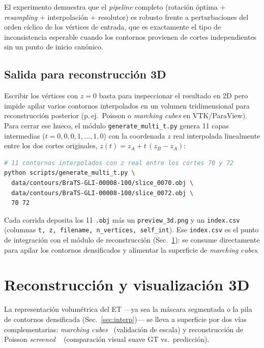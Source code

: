 \documentclass[conference]{IEEEtran}
\begin{document}
El experimento demuestra que el \emph{pipeline} completo (rotación óptima
$+$ \textit{resampling} $+$ interpolación $+$ resolutor) es robusto frente a
perturbaciones del orden cíclico de los vértices de entrada, que es
exactamente el tipo de inconsistencia esperable cuando los contornos provienen
de cortes independientes sin un punto de inicio canónico.

\subsection{Salida para reconstrucción 3D}
\label{subsec:multi-t}
Escribir los vértices con $z = 0$ basta para inspeccionar el resultado en 2D
pero impide apilar varios contornos interpolados en un volumen tridimensional
para reconstrucción posterior (p.\,ej.\ Poisson o \textit{marching cubes} en
VTK/ParaView). Para cerrar ese hueco, el módulo \texttt{generate\_multi\_t.py}
genera 11 capas intermedias ($t = 0{,}0, 0{,}1, \ldots, 1{,}0$) con la
coordenada $z$ real interpolada linealmente entre los dos cortes originales,
$z(t) = z_A + t\,(z_B - z_A)$:

\begin{lstlisting}[language=bash,basicstyle=\footnotesize\ttfamily,
                   breaklines=true,breakatwhitespace=true,columns=fullflexible]
# 11 contornos interpolados con z real entre los cortes 70 y 72
python scripts/generate_multi_t.py \
  data/contours/BraTS-GLI-00008-100/slice_0070.obj \
  data/contours/BraTS-GLI-00008-100/slice_0072.obj \
  70 72
\end{lstlisting}

Cada corrida deposita los 11 \texttt{.obj} más un \texttt{preview\_3d.png} y un
\texttt{index.csv} (columnas \texttt{t, z, filename, n\_vertices, self\_int}).
Ese \texttt{index.csv} es el punto de integración con el módulo de
reconstrucción (Sec.~\ref{sec:recon3d}): se consume directamente para apilar
los contornos densificados y alimentar la superficie de \textit{marching
cubes}.

\section{Reconstrucción y visualización 3D}
\label{sec:recon3d}
La representación volumétrica del ET ---ya sea la máscara segmentada o la pila
de contornos densificada (Sec.~\ref{sec:interp})--- se lleva a superficie por
dos vías complementarias: \textit{marching cubes}~\cite{lorensen1987marching}
(validación de escala) y reconstrucción de Poisson \emph{screened}
~\cite{kazhdan2013screened} (comparación visual suave GT vs.\ predicción).
\end{document}

